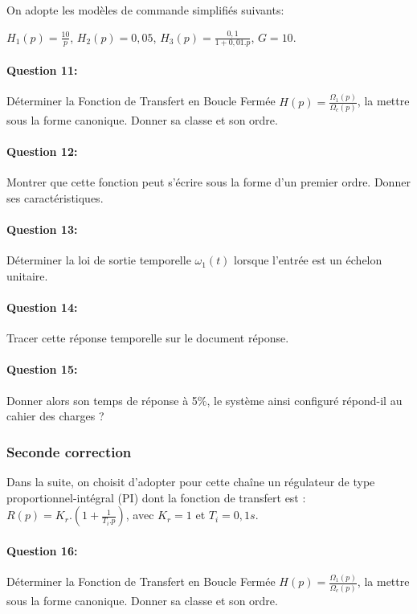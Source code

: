 On adopte les modèles de commande simplifiés suivants:

$H_1(p)=\frac{10}{p}$, $H_2(p)=0,05$, $H_3(p)=\frac{0,1}{1+0,01.p}$, $G=10$.

\paragraph{Question 11:} Déterminer la Fonction de Transfert en Boucle Fermée $H(p)=\frac{\Omega_1(p)}{\Omega_c(p)}$, la mettre sous la forme canonique. Donner sa classe et son ordre.

\paragraph{Question 12:} Montrer que cette fonction peut s'écrire sous la forme d'un premier ordre. Donner ses caractéristiques.

\paragraph{Question 13:} Déterminer la loi de sortie temporelle $\omega_1(t)$ lorsque l'entrée est un échelon unitaire.

\paragraph{Question 14:} Tracer cette réponse temporelle sur le document réponse.

\paragraph{Question 15:} Donner alors son temps de réponse à 5\%, le système ainsi configuré répond-il au cahier des charges ?

\subsubsection{Seconde correction}

Dans la suite, on choisit d'adopter pour cette chaîne un régulateur de type proportionnel-intégral (PI) dont la fonction de transfert est :
$R(p)=K_r.\left(1+\frac{1}{T_i.p}\right)$, avec $K_r=1$ et $T_i=0,1s$.

\paragraph{Question 16:}

Déterminer la Fonction de Transfert en Boucle Fermée $H(p)=\frac{\Omega_1(p)}{\Omega_c(p)}$, la mettre sous la forme canonique. Donner sa classe et son ordre.

